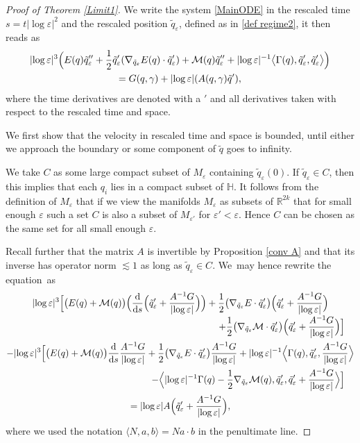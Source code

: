 \documentclass[JEP,XML,SOM,Unicode,published]{cedram}
\let\epsilon\varepsilon
\theoremstyle{definition}
\newcommand\R{\mathbb{R}}
\newcommand\eq{=}
\let\eps\epsilon
\begin{document}
\begin{proof}[Proof of Theorem \ref{Limit1}]
We write the system \eqref{MainODE} in the rescaled time $s=t|{\log\eps}|^2$ and the rescaled position $\tilde{q}_\eps$, defined as in \eqref{def regime2}, it then reads as
\begin{multline}\label{rescaled ODE}
|{\log\eps}|^3\Bigl(E(q)\tilde{q}_{\eps}''+\frac{1}{2}\tilde{q}_{\eps}'(\nabla_{\tilde{q}_\eps}E(q)\cdot\tilde{q}_{\eps}')+\mathcal{M}(q)\tilde{q}_\eps''+|{\log\eps}|^{-1}\bigl\langle\Gamma(q),\tilde{q}_{\eps}',\tilde{q}_{\eps}'\bigr\rangle \Bigr)\\
\eq G(q,\gamma)+|{\log\eps}|(A(q,\gamma)\tilde{q}'),
\end{multline}
where the time derivatives are denoted with a $'$ and all derivatives taken with respect to the rescaled time and space.

We first show that the velocity in rescaled time and space is bounded, until either we approach the boundary or some component of $\tilde{q}$ goes to infinity.

We take $C$ as some large compact subset of $M_\eps$ containing $\tilde{q}_\eps(0)$.
If $\tilde{q}_\eps\in C$, then this implies that each $q_i$ lies in a compact subset of $\mathbb{H}$. It follows from the definition of $M_\eps$ that if we view the manifolds $M_\eps$ as subsets of $\R^{2k}$ that for small enough $\eps$ such a set $C$ is also a subset of $M_{\eps'}$ for $\eps'<\eps$. Hence $C$ can be chosen as the same set for all small enough $\eps$.

Recall further that the matrix $A$ is invertible by Proposition \ref{conv A} and that its inverse has operator norm $\lesssim 1$ as long as $\tilde{q}_\eps\in C$. We~may hence rewrite the equation~as\vspace*{-5pt}
\begin{multline*}
|{\log\eps}|^3 \Bigr[\bigl(E(q)+\mathcal{M}(q)\bigr)\Bigl(\frac{\text{d}}{\text{d}s}\Bigl(\tilde{q}_\eps'+\frac{A^{-1}G}{|{\log\eps}|}\Bigr)\Bigr)+\frac{1}{2}\bigl(\nabla_{\tilde{q}_\eps}E\cdot\tilde{q}_\eps'\bigr)\Bigl(\tilde{q}_\eps'+\frac{A^{-1}G}{|{\log\eps}|}\Bigr)\\[-3pt]
\shoveright{+\frac{1}{2}\bigl(\nabla_{\tilde{q}_\eps}\mathcal{M}\cdot\tilde{q}_\eps'\bigr)\Bigl(\tilde{q}_\eps'+\frac{A^{-1}G}{|{\log\eps}|}\Bigr) \Bigr]}\\
-|{\log\eps}|^3 \Bigl[\bigl(E(q)+\mathcal{M}(q)\bigr)\frac{\text{d}}{\text{d}s}\frac{A^{-1}G}{|{\log\eps}|}+\frac{1}{2}\bigl(\nabla_{\tilde{q}_\eps}E\cdot\tilde{q}_\eps'\bigr)\frac{A^{-1}G}{|{\log\eps}|}+|{\log\eps}|^{-1}\Bigl\langle \Gamma(q),\tilde{q}_\eps',\frac{A^{-1}G}{|{\log\eps}|}\Bigr\rangle\\
\shoveright{-\Bigl\langle |{\log\eps}|^{-1}\Gamma(q)-\frac{1}{2}\nabla_{\tilde{q}_\eps}\mathcal{M}(q),\tilde{q}_\eps',\tilde{q}_\eps'+\frac{A^{-1}G}{|{\log\eps}|}\Bigr\rangle \Bigr]}\\
=|{\log\eps}|A\Bigl(\tilde{q}_\eps'+\frac{A^{-1}G}{|{\log\eps}|}\Bigr),
\end{multline*}
where we used the notation $\langle N,a,b\rangle=Na\cdot b$ in the penultimate line.


\end{proof}
\end{document}
